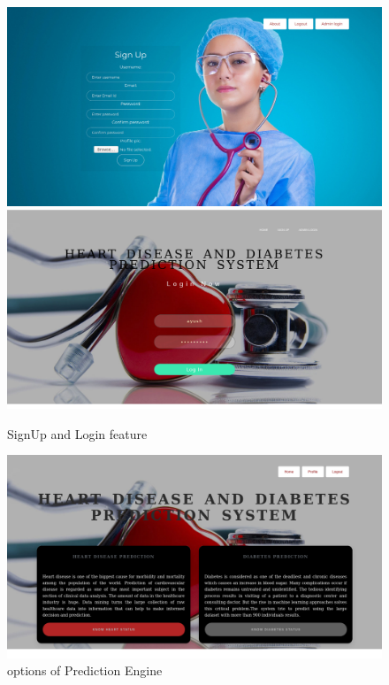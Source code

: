 \documentclass[oneside,12pt]{Classes/VTU}
\begin{document}
    			\begin{figure}
    				\begin{center}
    				\includegraphics[width=17cm]{Screenshots/sign-up.jpg}
    				\includegraphics[width=17cm]{Screenshots/login.PNG}
    				\caption{SignUp and Login feature}
    				\end{center}
    			\end{figure}
    			
    			\begin{figure}
    				\begin{center}
    				\includegraphics[width=17cm]{Screenshots/description-predict.PNG}
    				\caption{options of Prediction Engine}
    				\end{center}
    			\end{figure}
    			
\end{document}
